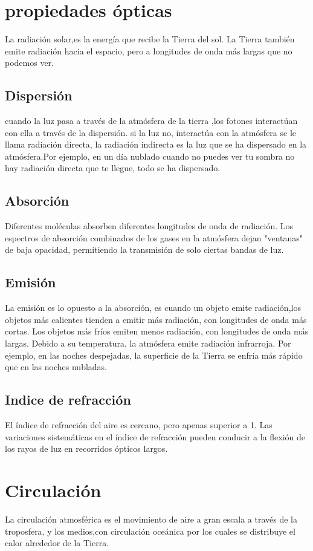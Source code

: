 \documentclass{article} %
\begin{document}
\section{propiedades ópticas}
La radiación solar,es la energía que recibe la Tierra del sol. La Tierra también emite radiación hacia el espacio, pero a longitudes de onda más largas que no podemos ver.
\subsection{Dispersión}
cuando la luz pasa a través de la atmósfera de la tierra ,los fotones interactúan con ella a través de la dispersión. si la luz no, interactúa con la atmósfera se le llama radiación directa, la radiación indirecta es la luz que se ha dispersado en la atmósfera.Por ejemplo, en un día nublado cuando no puedes ver tu sombra no hay radiación directa que te llegue, todo se ha dispersado.
\subsection{Absorción}
Diferentes moléculas absorben diferentes longitudes de onda de radiación.
Los espectros de absorción combinados de los gases en la atmósfera dejan "ventanas" de baja opacidad, permitiendo la transmisión de solo ciertas bandas de luz.
\subsection{Emisión}
La emisión es lo opuesto a la absorción, es cuando un objeto emite radiación,los objetos más calientes tienden a emitir más radiación, con longitudes de onda más cortas. Los objetos más fríos emiten menos radiación, con longitudes de onda más largas.
Debido a su temperatura, la atmósfera emite radiación infrarroja. Por ejemplo, en las noches despejadas, la superficie de la Tierra se enfría más rápido que en las noches nubladas.

\subsection{Indice de refracción}
El índice de refracción del aire es cercano, pero apenas superior a 1. Las variaciones sistemáticas en el índice de refracción pueden conducir a la flexión de los rayos de luz en recorridos ópticos largos.

\section{Circulación}
La circulación atmosférica es el movimiento de aire a gran escala a través de la troposfera, y los medios,con circulación oceánica por los cuales se distribuye el calor alrededor de la Tierra.
\end{document}
